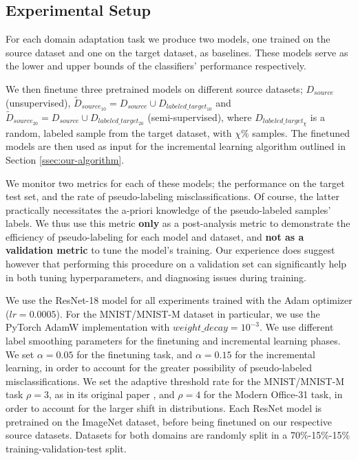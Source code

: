 \documentclass{article}
\begin{document}
	
	\subsection{Experimental Setup}
	
	For each domain adaptation task we produce two models, one trained on the source dataset and one on the target dataset, as baselines. These models serve as the lower and upper bounds of the classifiers' performance respectively.
	
	We then finetune three pretrained models on different source datasets; $D_{source}$ (unsupervised), $\tilde{D}_{source_{10}} = D_{source} \cup D_{labeled\_target_{10}}$ and $\tilde{D}_{source_{20}} = D_{source} \cup D_{labeled\_target_{20}}$ (semi-supervised), where $D_{labeled\_target_{\chi}}$ is a random, labeled sample from the target dataset, with $\chi\%$ samples. The finetuned models are then used as input for the incremental learning algorithm outlined in Section \ref{ssec:our-algorithm}.
	
	We monitor two metrics for each of these models; the performance on the target test set, and the rate of pseudo-labeling misclassifications. Of course, the latter practically necessitates the a-priori knowledge of the pseudo-labeled samples' labels. We thus use this metric \textbf{only} as a post-analysis metric to demonstrate the efficiency of pseudo-labeling for each model and dataset, and \textbf{not as a validation metric} to tune the model's training. Our experience does suggest however that performing this procedure on a validation set can significantly help in both tuning hyperparameters, and diagnosing issues during training.
	
	We use the ResNet-18 model \parencite{resnet} for all experiments trained with the Adam optimizer ($lr=0.0005$). For the MNIST/MNIST-M dataset in particular, we use the PyTorch AdamW implementation with $weight\_decay = 10^{-3}$. We use different label smoothing parameters for the finetuning and incremental learning phases. We set $\alpha = 0.05$ for the finetuning task, and $\alpha = 0.15$ for the incremental learning, in order to account for the greater possibility of pseudo-labeled misclassifications. We set the adaptive threshold rate for the MNIST/MNIST-M task $\rho = 3$, as in its original paper \cite{ican}, and $\rho=4$ for the Modern Office-31 task, in order to account for the larger shift in distributions. Each ResNet model is pretrained on the ImageNet \cite{imagenet} dataset, before being finetuned on our respective source datasets. Datasets for both domains are randomly split in a 70\%-15\%-15\% training-validation-test split.
	
\end{document}
